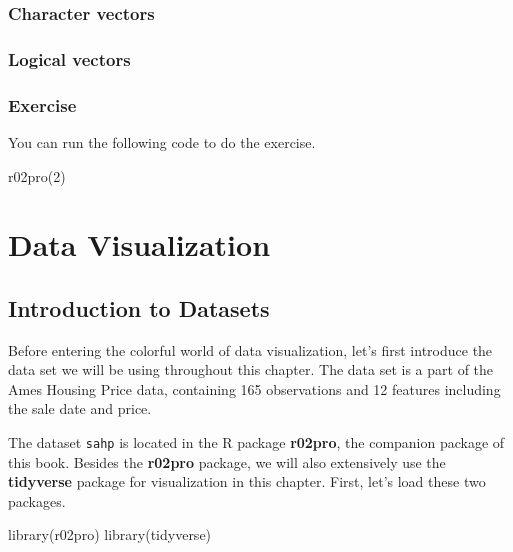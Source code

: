 \documentclass[
]{book}
\newenvironment{Shaded}{\begin{snugshade}}{\end{snugshade}}
\newcommand{\DecValTok}[1]{\textcolor[rgb]{0.00,0.00,0.81}{#1}}
\newcommand{\FunctionTok}[1]{\textcolor[rgb]{0.00,0.00,0.00}{#1}}
\newcommand{\NormalTok}[1]{#1}
\begin{document}
\hypertarget{character-vectors-1}{%
\subsection{Character vectors}\label{character-vectors-1}}

\hypertarget{logical-vectors-1}{%
\subsection{Logical vectors}\label{logical-vectors-1}}

\hypertarget{exercise-5}{%
\subsection{Exercise}\label{exercise-5}}

You can run the following code to do the exercise.

\begin{Shaded}
\begin{Highlighting}[]
\FunctionTok{r02pro}\NormalTok{(}\DecValTok{2}\NormalTok{)}
\end{Highlighting}
\end{Shaded}

\hypertarget{data-visualization}{%
\chapter{Data Visualization}\label{data-visualization}}

\hypertarget{intro-dataset}{%
\section{Introduction to Datasets}\label{intro-dataset}}

Before entering the colorful world of data visualization, let's first introduce the data set we will be using throughout this chapter. The data set is a part of the Ames Housing Price data, containing 165 observations and 12 features including the sale date and price.

The dataset \texttt{sahp} is located in the R package \textbf{r02pro}, the companion package of this book.
Besides the \textbf{r02pro} package, we will also extensively use the \textbf{tidyverse} package for visualization in this chapter.
First, let's load these two packages.

\begin{Shaded}
\begin{Highlighting}[]
\FunctionTok{library}\NormalTok{(r02pro)}
\FunctionTok{library}\NormalTok{(tidyverse)}
\end{Highlighting}
\end{Shaded}
\end{document}
